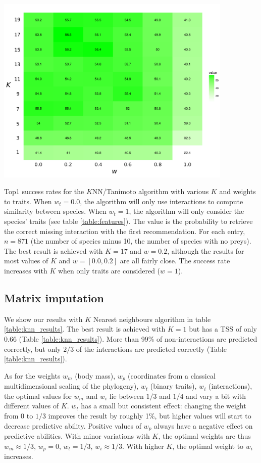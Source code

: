 \documentclass[letterpaper]{article}
\begin{document}
\begin{table}
  \centering\includegraphics[width=0.85\textwidth]{Figures/r/knn-heatmap.pdf}

  \caption{Top1 success rates for the $K$NN/Tanimoto algorithm with various
  $K$ and weights to traits. When $w_t = 0.0$, the algorithm will only use
  interactions to compute similarity between species. When $w_t = 1$, the
  algorithm will only consider the species' traits (see table
  \ref{table:features}). The value is the probability to retrieve the correct
  missing interaction with the first recommendation. For each entry, $n = 871$
  (the number of species minus 10, the number of species with no preys). The
  best result is achieved with $K = 17$ and $w = 0.2$, although the results
  for most values of $K$ and $w = [0.0, 0.2]$ are all fairly close. The
  success rate increases with $K$ when only traits are considered ($w = 1$).}

  \label{table:tanimoto_k_weights}
\end{table}

\subsection{Matrix imputation}

We show our results with $K$ Nearest neighbours algorithm in table
\ref{table:knn_results}. The best result is achieved with $K = 1$ but has a TSS
of only 0.66 (Table \ref{table:knn_results}). More than 99\% of
non-interactions are predicted correctly, but only $2/3$ of the interactions
are predicted correctly (Table \ref{table:knn_results}).

As for the weights $w_m$ (body mass), $w_p$ (coordinates from a classical
multidimensional scaling of the phylogeny), $w_t$ (binary traits), $w_i$
(interactions), the optimal values for $w_m$ and $w_i$ lie between $1/3$ and
$1/4$ and vary a bit with different values of $K$. $w_t$ has a small but
consistent effect: changing the weight from 0 to $1/3$ improves the result by
roughly 1\%, but higher values will start to decrease predictive ability.
Positive values of $w_p$ always have a negative effect on predictive abilities.
With minor variations with $K$, the optimal weights are thus $w_m \approx 1 /
3$, $w_p = 0$, $w_t = 1 / 3$, $w_i \approx 1 / 3$. With higher $K$, the optimal
weight to $w_i$ increases.
\end{document}
